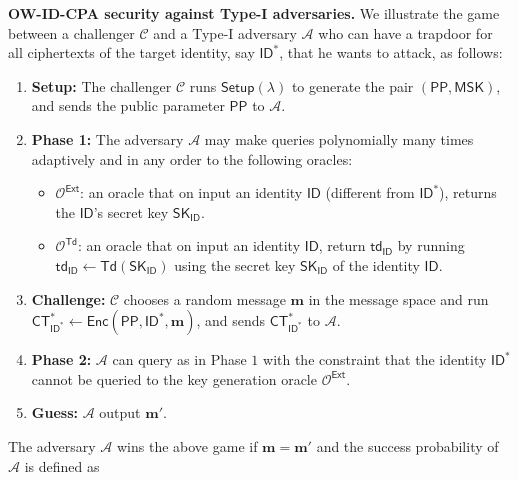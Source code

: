 \documentclass[runningheads]{llncs}
\def\cal{\mathcal}
\def\bf{\mathbf}
\def\SK{\mathsf{SK}}
\def\PP{\mathsf{PP}}
\def\MSK{\mathsf{MSK}}
\def\CT{\mathsf{CT}}
\def\td{\mathsf{td}}
\def\Setup{\mathsf{Setup}}
\def\Enc{\mathsf{Enc}}
\def\Ext{\mathsf{Ext}}
\def\Dec{\mathsf{Dec}}
\def\Td{\mathsf{Td}}
\def\ID{\mathsf{ID}}
\begin{document}
	\noindent\textbf{OW-ID-CPA security against Type-I adversaries.} We illustrate the game between a challenger $\cal{C}$ and a Type-I adversary $\cal{A}$ who can have a trapdoor for all ciphertexts of the target identity, say $\ID^*$, that he wants to attack, as follows:
	\begin{enumerate}
		\item \textbf{Setup:} The challenger $\cal{C}$ runs $\Setup(\lambda)$ to generate the pair $(\PP,\MSK)$, and sends the public parameter $\PP$ to $\cal{A}$.
		\item \textbf{Phase 1:}  The adversary $\cal{A}$ may make queries polynomially many times adaptively and in any order to the following oracles:
		\begin{itemize}
			\item $\cal{O}^{\Ext}$: an oracle that on input an identity $\ID$ (different from $\ID^*$), returns the $\ID$'s secret key $\SK_{\ID}$.
			\item $\cal{O}^\Td$: an oracle that on input an identity $\ID$, return $\td_{\ID}$ by running $\td_{\ID}\gets\Td(\SK_{\ID})$ using the secret key $\SK_{\ID}$ of the identity $\ID$.
		\end{itemize}
		\item \textbf{Challenge:} $\cal{C}$ chooses a random message $\bf{m}$ in the message space and run $\CT^*_{\ID^*}\gets\Enc(\PP,\ID^*,\bf{m})$, and sends $\CT_{\ID^*}^*$ to $\cal{A}$.
		\item \textbf{Phase 2:} $\cal{A}$ can query as in Phase $1$ with the constraint that the identity $\ID^*$ cannot be queried to the key generation oracle $\cal{O}^{\Ext}$.
		\item \textbf{Guess:} $\cal{A}$ output $\bf{m}'$.
	\end{enumerate}
	The adversary $\cal{A}$ wins the above game if $\bf{m}=\bf{m}'$ and the success probability of $\cal{A}$ is defined as
\end{document}
